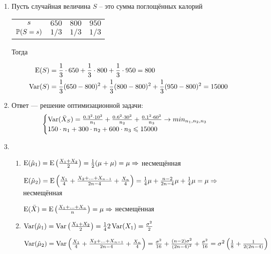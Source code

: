 \begin{enumerate}
\item Пусть случайная величина $S$ – это сумма поглощённых калорий

\begin{center}
\begin{tabular}{cccc}
\toprule
$s$ & $650$ & $800$ & $950$ \\
$\P(S=s)$ & $1/3$ & $1/3$ & $1/3$ \\ \bottomrule
\end{tabular}
\end{center}

Тогда

\begin{align*}
\E(S) &= \frac{1}{3}\cdot 650 + \frac{1}{3}\cdot 800 +  \frac{1}{3}\cdot 950 = 800 \\
\Var(S) &= \frac{1}{3}(650-800)^2 + \frac{1}{3}(800-800)^2 + \frac{1}{3}(950-800)^2 = 15000
\end{align*}

\item Ответ — решение оптимизационной задачи:
\[
\begin{cases}
\Var(\bar{X}_S) = \frac{0.3^2\cdot 10^2}{n_1} + \frac{0.6^2 \cdot 30^2}{n_2} + \frac{0.1^2 \cdot 60^2}{n_3} \to min_{n_1, n_2, n_3} \\
150\cdot n_1 + 300 \cdot n_2 + 600 \cdot n_3 \leq 15000
\end{cases}
\]

\item
\begin{enumerate}
\item $\E(\hat \mu_1) = \E\left(\frac{X_1+X_2}{2}\right)  = \frac{1}{2}(\mu+\mu) = \mu \Rightarrow$  несмещённая

$\E(\hat \mu_2) = \E \left(\frac{X_1}{4} + \frac{X_2+\ldots+X_{n-1}}{2n-4} + \frac{X_n}{4}\right) = \frac{1}{4}\mu + \frac{n-2}{2n-4}\mu + \frac{1}{4}\mu = \mu \Rightarrow$ несмещённая

$\E(\bar{X}) = \E\left(\frac{X_1 + \ldots + X_n}{n}\right) = \mu \Rightarrow$ несмещённая

\item $\Var(\hat \mu_1) = \Var\left(\frac{X_1+X_2}{2}\right)  = \frac{1}{4}2\Var(X_1) = \frac{\sigma^2}{2}$

$\Var(\hat \mu_2) = \Var \left(\frac{X_1}{4} + \frac{X_2+\ldots+X_{n-1}}{2n-4} + \frac{X_n}{4}\right)  = \frac{\sigma^2}{16} + \frac{(n-2)\sigma^2}{(2n-4)^2} + \frac{\sigma^2}{16} = \sigma^2\left(\frac{1}{8} + \frac{1}{2(2n-4)} \right)$


\end{enumerate}
\end{enumerate}
